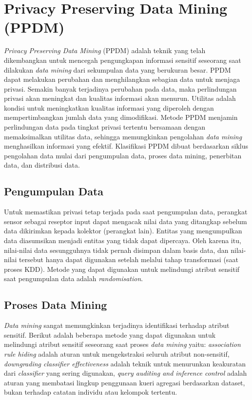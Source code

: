 \section{Privacy Preserving Data Mining (PPDM)} 
\textit{Privacy Preserving Data Mining} (PPDM) adalah teknik yang telah dikembangkan untuk mencegah pengungkapan informasi sensitif seseorang saat dilakukan \textit{data mining} dari sekumpulan data yang berukuran besar. PPDM dapat melakukan perubahan dan  menghilangkan sebagian data untuk menjaga privasi. Semakin banyak terjadinya perubahan pada data, maka perlindungan privasi akan meningkat dan kualitas informasi akan menurun. Utilitas adalah kondisi untuk meningkatkan kualitas informasi yang diperoleh dengan mempertimbangkan jumlah data yang dimodifikasi. Metode PPDM menjamin perlindungan data pada tingkat privasi tertentu bersamaan dengan memaksimalkan utilitas data, sehingga memungkinkan pengolahan \textit{data mining} menghasilkan informasi yang efektif. Klasifikasi PPDM dibuat berdasarkan siklus pengolahan data mulai dari pengumpulan data, proses data mining, penerbitan data, dan distribusi data.

\subsection{Pengumpulan Data} 
Untuk memastikan privasi tetap terjada pada saat pengumpulan data, perangkat sensor sebagai reseptor input dapat mengacak nilai data yang ditangkap sebelum data dikirimkan kepada kolektor (perangkat lain). Entitas yang mengumpulkan data diasumsikan menjadi entitas yang tidak dapat dipercaya. Oleh karena itu, nilai-nilai data sesungguhnya tidak pernah disimpan dalam basis data, dan nilai-nilai tersebut hanya dapat digunakan setelah melalui tahap transformasi (saat proses KDD). Metode yang dapat digunakan untuk melindungi atribut sensitif saat pengumpulan data adalah \textit{randomisation}.

\subsection{Proses Data Mining} 
\textit{Data mining} sangat memungkinkan terjadinya identifikasi terhadap atribut sensitif. Berikut adalah beberapa metode yang dapat digunakan untuk melindungi atribut sensitif seseorang saat proses \textit{data mining} yaitu: \textit{association rule hiding} adalah aturan untuk mengekstraksi seluruh atribut non-sensitif, \textit{downgrading classifier effectiveness} adalah teknik untuk menurunkan keakuratan dari \textit{classifier} yang sering digunakan, \textit{query auditing and inference control} adalah aturan yang membatasi lingkup penggunaan kueri agregasi berdasarkan dataset, bukan terhadap catatan individu atau kelompok tertentu.

